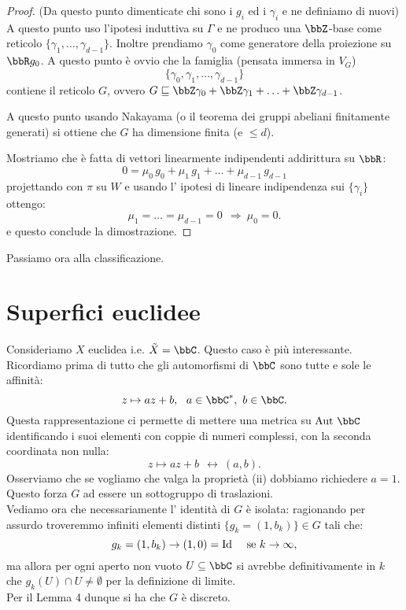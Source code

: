 \begin{proof}
    (Da questo punto dimenticate chi sono i $g_i$ ed i $\gamma_i$ e ne definiamo di nuovi)
    A questo punto uso l'ipotesi induttiva su $\Gamma$ e ne produco una $\bbZ$-base come reticolo $\{\gamma_1, \ldots, \gamma_{d-1}\}$.
    Inoltre prendiamo $\gamma_0$ come generatore della proiezione su $\bbR g_0$.
    A questo punto è ovvio che la famiglia (pensata immersa in $V_G$)
    $$
    \{\gamma_0,\gamma_1,\ldots,\gamma_{d-1}\}
    $$
    contiene il reticolo $G$, ovvero $G \sqsubseteq \bbZ \gamma_0 + \bbZ \gamma_1 + \ldots + \bbZ \gamma_{d-1}$.

    A questo punto usando Nakayama (o il teorema dei gruppi abeliani finitamente generati) si ottiene che $G$ ha dimensione finita (e $\le d$).

    Mostriamo che è fatta di vettori linearmente indipendenti addirittura su $\bbR$:
    $$
    0=\mu_0\, g_0+\mu_1\, g_1+\ldots+\mu_{d-1}\, g_{d-1}
    $$
    projettando con $\pi$ su $W$ e usando l' ipotesi di lineare indipendenza sui $\{\gamma_i\}$ ottengo:
    $$
    \mu_1=\ldots=\mu_{d-1}=0\ \ \Rightarrow\  \mu_0=0.
    $$
    e questo conclude la dimostrazione.
\end{proof}

Passiamo ora alla classificazione.



\section{Superfici euclidee}

Consideriamo $X$ euclidea i.e. $\tilde{X}=\bbC$. Questo caso è più interessante. Ricordiamo prima di tutto che gli automorfismi di $\bbC$ sono tutte e sole le affinità:
$$
z\mapsto az+b,\ \ a\in\bbC^*,\ b\in \bbC.
$$
Questa rappresentazione ci permette di mettere una metrica su $\Aut{\bbC}$ identificando i suoi elementi con coppie di numeri complessi, con la seconda coordinata non nulla:
$$
z\mapsto az+b\ \ \leftrightarrow\  (a,b).
$$
Osserviamo che se vogliamo che valga la proprietà (ii) dobbiamo richiedere $a=1$. Questo forza $G$ ad essere un sottogruppo di traslazioni.\\
Vediamo ora che necessariamente l' identità di $G$ è isolata: ragionando per assurdo troveremmo infiniti elementi distinti $\{ g_k=(1,b_k) \}\in G$ tali che:
$$
g_k=(1,b_k)\rightarrow (1,0)=\Id\ \ \ \mbox{ se } k \rightarrow \infty,
$$
ma allora per ogni aperto non vuoto $U\subseteq \bbC$ si avrebbe definitivamente in $k$ che $g_k(U)\cap U\neq \emptyset$ per la definizione di limite.\\
Per il Lemma 4 dunque si ha che $G$ è discreto.


